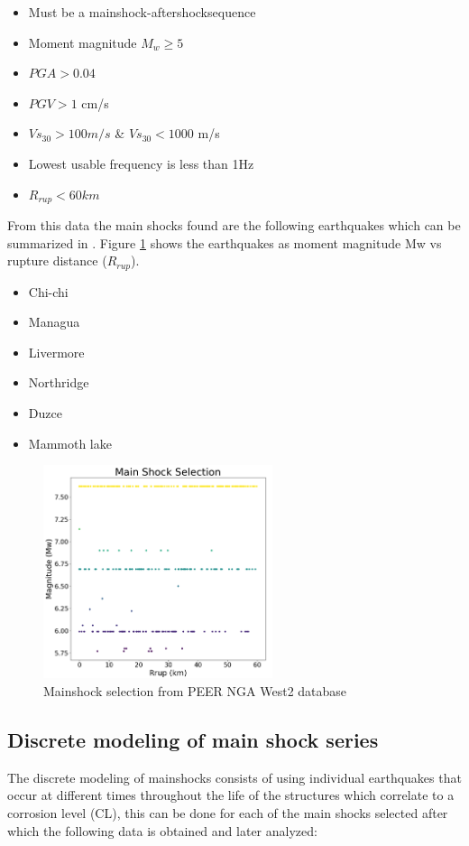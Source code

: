 \begin{itemize}
	\item Must be a mainshock-aftershocksequence
	\item Moment magnitude $M_w \geqslant 5$
	\item $PGA>0.04$
	\item $PGV>1$ cm/s
	\item $Vs_{30}>100m/s$ \& $Vs_{30}<1000$ m/s
	\item Lowest usable frequency is less than 1Hz
	\item $R_{rup}<60km$
\end{itemize}

From this data the main shocks found are the following earthquakes which can be summarized in . Figure \ref{fig:MS_Selection} shows the earthquakes as moment magnitude {Mw} vs rupture distance ($R_{rup}$).

\begin{itemize}
	\item Chi-chi
	\item Managua
	\item Livermore
	\item Northridge
	\item Duzce 
	\item Mammoth lake
\end{itemize}

\begin{figure}[htbp]
	\centering
	\includegraphics[width=0.6\textwidth]{Chapter-4/figs/MainShock_Selection}
	\caption{Mainshock selection from PEER NGA West2 database}
	\label{fig:MS_Selection}
\end{figure}

\subsection{Discrete modeling of main shock series}
The discrete modeling of mainshocks consists of using individual earthquakes that occur at different times throughout the life of the structures which correlate to a corrosion level (CL), this can be done for each of the main shocks selected after which the following data is obtained and later analyzed:


